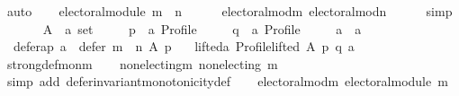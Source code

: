 \begin{isabellebody}
\ auto\isanewline
\ \ \isamarkupfalse%
\ {\isachardoublequoteopen}electoral{\isacharunderscore}{\kern0pt}module\ {\isacharparenleft}{\kern0pt}m\ {\isasymtriangleright}\ n{\isacharparenright}{\kern0pt}{\isachardoublequoteclose}\isanewline
\ \ \ \ \isamarkupfalse%
\ electoral{\isacharunderscore}{\kern0pt}mod{\isacharunderscore}{\kern0pt}m\ electoral{\isacharunderscore}{\kern0pt}mod{\isacharunderscore}{\kern0pt}n\isanewline
\ \ \ \ \isamarkupfalse%
\ simp\isanewline
{}\isamarkupfalse%
\isanewline
\ \ \isamarkupfalse%
\isanewline
\ \ \ \ A\ {\isacharcolon}{\kern0pt}{\isacharcolon}{\kern0pt}\ {\isachardoublequoteopen}{\isacharprime}{\kern0pt}a\ set{\isachardoublequoteclose}\ \isanewline
\ \ \ \ p\ {\isacharcolon}{\kern0pt}{\isacharcolon}{\kern0pt}\ {\isachardoublequoteopen}{\isacharprime}{\kern0pt}a\ Profile{\isachardoublequoteclose}\ \isanewline
\ \ \ \ q\ {\isacharcolon}{\kern0pt}{\isacharcolon}{\kern0pt}\ {\isachardoublequoteopen}{\isacharprime}{\kern0pt}a\ Profile{\isachardoublequoteclose}\ \isanewline
\ \ \ \ a\ {\isacharcolon}{\kern0pt}{\isacharcolon}{\kern0pt}\ {\isachardoublequoteopen}{\isacharprime}{\kern0pt}a{\isachardoublequoteclose}\isanewline
\ \ \isamarkupfalse%
\isanewline
\ \ defer{\isacharunderscore}{\kern0pt}a{\isacharunderscore}{\kern0pt}p{\isacharcolon}{\kern0pt}\ {\isachardoublequoteopen}a\ {\isasymin}\ defer\ {\isacharparenleft}{\kern0pt}m\ {\isasymtriangleright}\ n{\isacharparenright}{\kern0pt}\ A\ p{\isachardoublequoteclose}\ \isanewline
\ \ lifted{\isacharunderscore}{\kern0pt}a{\isacharcolon}{\kern0pt}\ {\isachardoublequoteopen}Profile{\isachardot}{\kern0pt}lifted\ A\ p\ q\ a{\isachardoublequoteclose}\isanewline
\ \ \isamarkupfalse%
\ strong{\isacharunderscore}{\kern0pt}def{\isacharunderscore}{\kern0pt}mon{\isacharunderscore}{\kern0pt}m\isanewline
\ \ \isamarkupfalse%
\ non{\isacharunderscore}{\kern0pt}electing{\isacharunderscore}{\kern0pt}m{\isacharcolon}{\kern0pt}\ {\isachardoublequoteopen}non{\isacharunderscore}{\kern0pt}electing\ m{\isachardoublequoteclose}\isanewline
\ \ \ \ \isamarkupfalse%
\ {\isacharparenleft}{\kern0pt}simp\ add{\isacharcolon}{\kern0pt}\ defer{\isacharunderscore}{\kern0pt}invariant{\isacharunderscore}{\kern0pt}monotonicity{\isacharunderscore}{\kern0pt}def{\isacharparenright}{\kern0pt}\isanewline
\ \ \isamarkupfalse%
\ electoral{\isacharunderscore}{\kern0pt}mod{\isacharunderscore}{\kern0pt}m{\isacharcolon}{\kern0pt}\ {\isachardoublequoteopen}electoral{\isacharunderscore}{\kern0pt}module\ m{\isachardoublequoteclose}\isanewline

\end{isabellebody}
